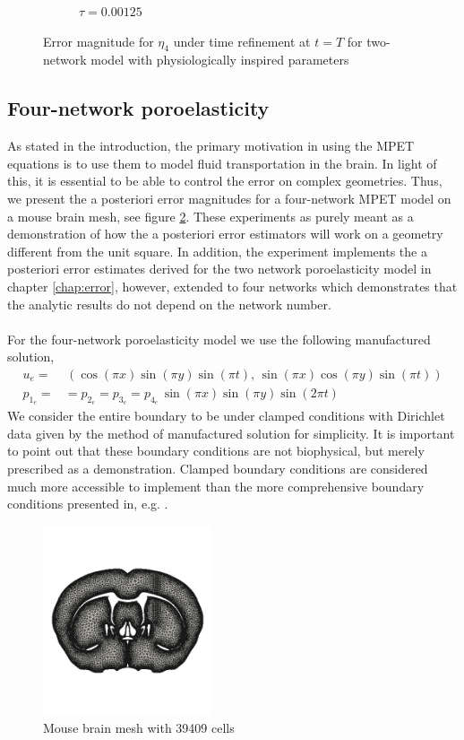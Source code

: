 \begin{figure}[h!]
\begin{subfigure}[b]{0.24\textwidth}
    \caption{$\tau=0.00125$}
  \end{subfigure}
  \caption{Error magnitude for $\eta_4$ under time refinement at $t=T$ for two-network model with physiologically inspired parameters} \label{fig:bb_bio_eta4}
\end{figure}
\newpage
\newpage

\subsection{Four-network poroelasticity} \label{test_mpet4}
As stated in the introduction, the primary motivation in using the MPET equations is to use them to model fluid transportation in the brain. In light of this, it is essential to be able to control the error on complex geometries. Thus, we present the a posteriori error magnitudes for a four-network MPET model on a mouse brain mesh, see figure \ref{fig:brain_mesh}. These experiments as purely meant as a demonstration of how the a posteriori error estimators will work on a geometry different from the unit square. In addition, the experiment implements the a posteriori error estimates derived for the two network poroelasticity model in chapter \ref{chap:error}, however, extended to four networks which demonstrates that the analytic results do not depend on the network number. 
\\
\\ 
For the four-network poroelasticity model we use the following manufactured solution,
\begin{align*}
u_e = & \, \left(\cos(\pi x)\sin(\pi y)\sin(\pi t), \, \sin( \pi x)\cos(\pi y)\sin(\pi t)\right) \\
p_{1_e} = & = p_{2_e} = p_{3_e} = p_{4_e} \,\sin(\pi x) \sin(\pi y)\sin(2\pi t)  
\end{align*}
We consider the entire boundary to be under clamped conditions with Dirichlet data given by the method of manufactured solution for simplicity. It is important to point out that these boundary conditions are not biophysical, but merely prescribed as a demonstration. Clamped boundary conditions are considered much more accessible to implement than the more comprehensive boundary conditions presented in, e.g. \cite{vardakis}. 
\\
\begin{figure}[h!]
\centering
  \includegraphics[width=50mm, scale=0.6]{figures/4_mpet/biomedical/brain_mesh.png}
  \caption[Caption for LOF]{Mouse brain mesh\footnotemark{} with 39409 cells }
  \label{fig:brain_mesh}
\end{figure}
